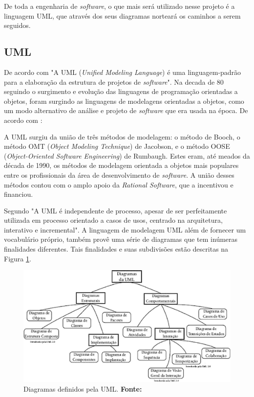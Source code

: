 	\par De toda a engenharia de \textit{software}, o que mais será utilizado nesse
projeto é a linguagem UML, que através dos seus diagramas norteará os caminhos
a serem seguidos.
	
	\subsection{UML}
		
		\par De acordo com  "A UML (\textit{Unified Modeling
	Language}) é uma linguagem-padrão para a elaboração da estrutura de projetos
	de \textit{software}". Na decada de 80 seguindo o surgimento e evolução das
	linguagens de programação orientadas a objetos, foram surgindo as linguagens de
	modelagens orientadas a objetos, como um modo alternativo de análise e projeto
	de \textit{software} que era usada na época. De acordo com
	:
		\begin{citacao}
			A UML surgiu da união de três métodos de modelagem: o método de Booch, o
			método OMT (\textit{Object Modeling Technique}) de Jacobson, e o método OOSE
			(\textit{Object-Oriented Software Engineering}) de Rumbaugh. Estes eram, até
			meados da década de 1990, os métodos de modelagem orientada a objetos mais
			populares entre os profissionais da área de desenvolvimento de
			\textit{software}. A união desses métodos contou com o amplo apoio da
			\textit{Rational Software}, que a incentivou e financiou.
		\end{citacao}
		
			\par Segundo  "A
		 UML é independente de processo, apesar de ser perfeitamente utilizada em
		 processo orientado a casos de usos, centrado na arquitetura, interativo e
		 incremental". A linguagem de modelagem UML além de fornecer um vocabulário
		 próprio, também provê uma série de diagramas que tem inúmeras finalidades
		 diferentes. Tais finalidades e suas subdivisões estão descritas na Figura
		 \ref{fig:qt4}.
				
		\begin{figure}[h!]
			\centerline{\includegraphics[scale=0.8]{./imagens/1_q_teorico/qt4.png}}
				\caption[Principais Diagramas definidos pela UML.]{Diagramas definidos pela
				UML. \textbf{Fonte:}}
				\label{fig:qt4}
		\end{figure}
		
